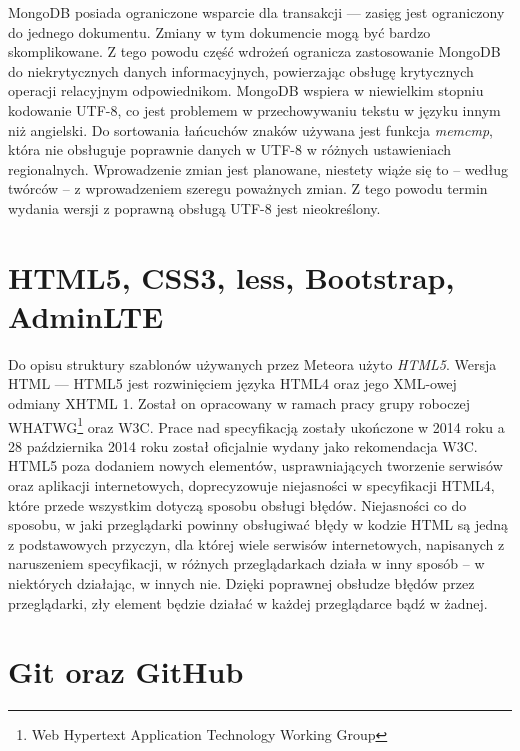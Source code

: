 MongoDB posiada ograniczone wsparcie dla transakcji --- zasięg jest ograniczony do jednego dokumentu. Zmiany w tym dokumencie mogą być bardzo skomplikowane. Z tego powodu część wdrożeń ogranicza zastosowanie MongoDB do niekrytycznych danych informacyjnych, powierzając obsługę krytycznych operacji relacyjnym odpowiednikom. 
MongoDB wspiera w niewielkim stopniu kodowanie UTF-8, co jest problemem w przechowywaniu tekstu w języku innym niż angielski. Do sortowania łańcuchów znaków używana jest funkcja \emph{memcmp}, która nie obsługuje poprawnie danych w UTF-8 w różnych ustawieniach regionalnych. Wprowadzenie zmian jest planowane, niestety wiąże się to -- według twórców -- z wprowadzeniem szeregu poważnych zmian. Z tego powodu termin wydania wersji z poprawną obsługą UTF-8 jest nieokreślony\cite{mongoWiki}.

\section{HTML5, CSS3, less, Bootstrap, AdminLTE}

Do opisu struktury szablonów używanych przez Meteora użyto \emph{HTML5}. Wersja HTML --- HTML5 jest rozwinięciem języka HTML4 oraz jego XML-owej odmiany XHTML 1. Został on opracowany w ramach pracy grupy roboczej WHATWG\footnote{Web Hypertext Application Technology Working Group} oraz W3C. Prace nad specyfikacją zostały ukończone w 2014 roku a 28 października 2014 roku został oficjalnie wydany jako rekomendacja W3C. HTML5 poza dodaniem nowych elementów, usprawniających tworzenie serwisów oraz aplikacji internetowych, doprecyzowuje niejasności w specyfikacji HTML4, które przede wszystkim dotyczą sposobu obsługi błędów. Niejasności co do sposobu, w jaki przeglądarki powinny obsługiwać błędy w kodzie HTML są jedną z podstawowych przyczyn, dla której wiele serwisów internetowych, napisanych z naruszeniem specyfikacji, w różnych przeglądarkach działa w inny sposób -- w niektórych działając, w innych nie. Dzięki poprawnej obsłudze błędów przez przeglądarki, zły element będzie działać w każdej przeglądarce bądź w żadnej. 


\section{Git oraz GitHub}


